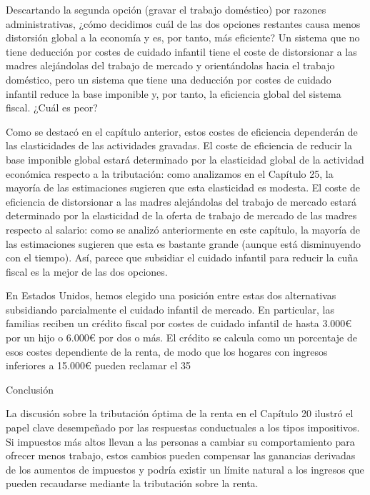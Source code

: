 \documentclass[10pt,a4paper]{article}
\begin{document}
Descartando la segunda opción (gravar el trabajo doméstico) por razones administrativas, ¿cómo decidimos cuál de las dos opciones restantes causa menos distorsión global a la economía y es, por tanto, más eficiente? Un sistema que no tiene deducción por costes de cuidado infantil tiene el coste de distorsionar a las madres alejándolas del trabajo de mercado y orientándolas hacia el trabajo doméstico, pero un sistema que tiene una deducción por costes de cuidado infantil reduce la base imponible y, por tanto, la eficiencia global del sistema fiscal. ¿Cuál es peor?

Como se destacó en el capítulo anterior, estos costes de eficiencia dependerán de las elasticidades de las actividades gravadas. El coste de eficiencia de reducir la base imponible global estará determinado por la elasticidad global de la actividad económica respecto a la tributación: como analizamos en el Capítulo 25, la mayoría de las estimaciones sugieren que esta elasticidad es modesta. El coste de eficiencia de distorsionar a las madres alejándolas del trabajo de mercado estará determinado por la elasticidad de la oferta de trabajo de mercado de las madres respecto al salario: como se analizó anteriormente en este capítulo, la mayoría de las estimaciones sugieren que esta es bastante grande (aunque está disminuyendo con el tiempo). Así, parece que subsidiar el cuidado infantil para reducir la cuña fiscal es la mejor de las dos opciones.

En Estados Unidos, hemos elegido una posición entre estas dos alternativas subsidiando parcialmente el cuidado infantil de mercado. En particular, las familias reciben un crédito fiscal por costes de cuidado infantil de hasta 3.000€ por un hijo o 6.000€ por dos o más. El crédito se calcula como un porcentaje de esos costes dependiente de la renta, de modo que los hogares con ingresos inferiores a 15.000€ pueden reclamar el 35 %

Conclusión

La discusión sobre la tributación óptima de la renta en el Capítulo 20 ilustró el papel clave desempeñado por las respuestas conductuales a los tipos impositivos. Si impuestos más altos llevan a las personas a cambiar su comportamiento para ofrecer menos trabajo, estos cambios pueden compensar las ganancias derivadas de los aumentos de impuestos y podría existir un límite natural a los ingresos que pueden recaudarse mediante la tributación sobre la renta.
\end{document}
